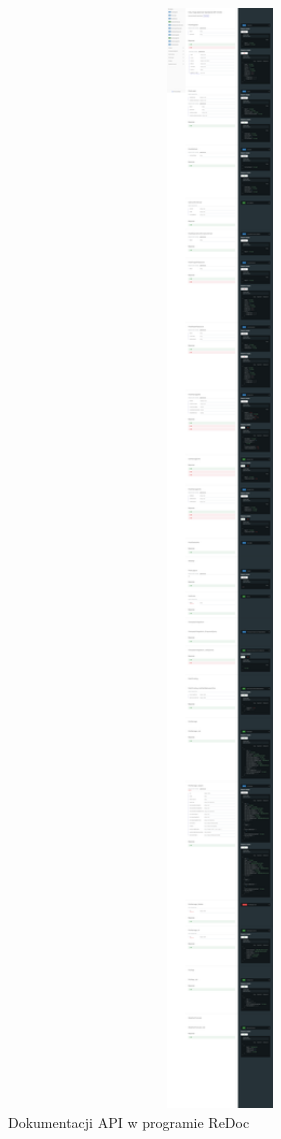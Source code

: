 \begin{figure}[H]
\centering
\includegraphics[width=1\textwidth]{attachments/redoc}
\caption{Dokumentacji API w programie ReDoc}
\label{fig:figure}
\end{figure}

